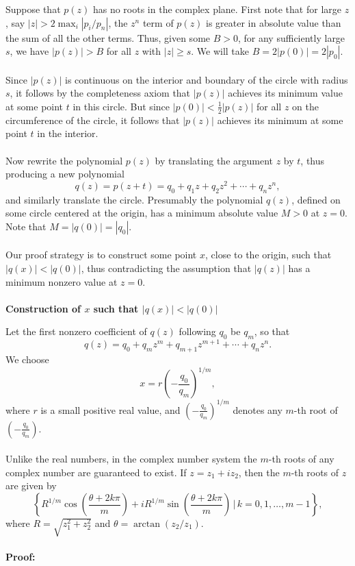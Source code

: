 Suppose that \(p(z)\) has no roots in the complex plane. First note that for large \(z\), say \(|z| > 2 \max_i |p_i/p_n|\), the \(z^n\) term of \(p(z)\) is greater in absolute 
value than the sum of all the other terms. Thus, given some \(B > 0\), for any sufficiently large \(s\), we have \(|p(z)| > B\) for all \(z\) with \(|z| \geq s\). We will take \(B = 2|p(0)| = 2|p_0|\).
\\\\
Since \(|p(z)|\) is continuous on the interior and boundary of the circle with radius \(s\), it follows by the completeness axiom that \(|p(z)|\) achieves its minimum value at some point \(t\) in this circle. But since \(|p(0)| < \frac{1}{2} |p(z)|\) for all \(z\) on the circumference of the circle, it follows that \(|p(z)|\) achieves its minimum at some point \(t\) in the interior.
\\\\
Now rewrite the polynomial \(p(z)\) by translating the argument \(z\) by \(t\), thus producing a new polynomial
\[
	q(z) = p(z + t) = q_0 + q_1 z + q_2 z^2 + \cdots + q_n z^n,
\]
and similarly translate the circle. Presumably the polynomial \(q(z)\), defined on some circle centered at the origin, has a minimum absolute value \(M > 0\) at \(z = 0\). Note that \(M = |q(0)| = |q_0|\).
\\\\
Our proof strategy is to construct some point \(x\), close to the origin, such that \(|q(x)| < |q(0)|\), thus contradicting the assumption that \(|q(z)|\) has a minimum nonzero value at \(z = 0\).
\\\\
\textbf{Construction of \(x\) such that \(|q(x)| < |q(0)|\)}

Let the first nonzero coefficient of \(q(z)\) following \(q_0\) be \(q_m\), so that
\[
	q(z) = q_0 + q_m z^m + q_{m+1} z^{m+1} + \cdots + q_n z^n.
\]
We choose
\[
	x = r \left(-\frac{q_0}{q_m}\right)^{1/m},
\]
where \(r\) is a small positive real value, and \(\left(-\frac{q_0}{q_m}\right)^{1/m}\) denotes any \(m\)-th root of \(\left(-\frac{q_0}{q_m}\right)\).
\\\\
Unlike the real numbers, in the complex number system the \(m\)-th roots of any complex number are guaranteed to exist. If \(z = z_1 + i z_2\), then the \(m\)-th roots of \(z\) are given by
\[
	\left\{ R^{1/m} \cos\left(\frac{\theta + 2k\pi}{m}\right) + i R^{1/m} \sin\left(\frac{\theta + 2k\pi}{m}\right) \,\bigg|\, k = 0, 1, \ldots, m-1 \right\},
\]
where \(R = \sqrt{z_1^2 + z_2^2}\) and \(\theta = \arctan(z_2 / z_1)\).
\\\\
\textbf{Proof:} 

